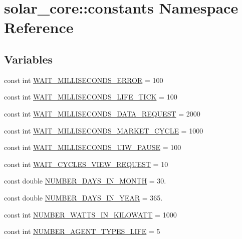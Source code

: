 \hypertarget{namespacesolar__core_1_1constants}{}\section{solar\+\_\+core\+:\+:constants Namespace Reference}
\label{namespacesolar__core_1_1constants}
\subsection*{Variables}
\begin{DoxyCompactItemize}
\item 
const int \hyperlink{namespacesolar__core_1_1constants_a4cddd8d733f9237d6fb56197354fed46}{W\+A\+I\+T\+\_\+\+M\+I\+L\+L\+I\+S\+E\+C\+O\+N\+D\+S\+\_\+\+E\+R\+R\+O\+R} = 100
\item 
const int \hyperlink{namespacesolar__core_1_1constants_ab90981a98985a16f6e239808f36186d7}{W\+A\+I\+T\+\_\+\+M\+I\+L\+L\+I\+S\+E\+C\+O\+N\+D\+S\+\_\+\+L\+I\+F\+E\+\_\+\+T\+I\+C\+K} = 100
\item 
const int \hyperlink{namespacesolar__core_1_1constants_a88d556c323e6871de3313428289b6cb6}{W\+A\+I\+T\+\_\+\+M\+I\+L\+L\+I\+S\+E\+C\+O\+N\+D\+S\+\_\+\+D\+A\+T\+A\+\_\+\+R\+E\+Q\+U\+E\+S\+T} = 2000
\item 
const int \hyperlink{namespacesolar__core_1_1constants_ab3dddf011f92328166c5f93e3951107e}{W\+A\+I\+T\+\_\+\+M\+I\+L\+L\+I\+S\+E\+C\+O\+N\+D\+S\+\_\+\+M\+A\+R\+K\+E\+T\+\_\+\+C\+Y\+C\+L\+E} = 1000
\item 
const int \hyperlink{namespacesolar__core_1_1constants_abebba44aef8bbf544a330b8b20229320}{W\+A\+I\+T\+\_\+\+M\+I\+L\+L\+I\+S\+E\+C\+O\+N\+D\+S\+\_\+\+U\+I\+W\+\_\+\+P\+A\+U\+S\+E} = 100
\item 
const int \hyperlink{namespacesolar__core_1_1constants_ae4d0a481c94f57be3e97f1c8463e631a}{W\+A\+I\+T\+\_\+\+C\+Y\+C\+L\+E\+S\+\_\+\+V\+I\+E\+W\+\_\+\+R\+E\+Q\+U\+E\+S\+T} = 10
\item 
const double \hyperlink{namespacesolar__core_1_1constants_ad1ba09888c65cd255ec5e71f9121b1ed}{N\+U\+M\+B\+E\+R\+\_\+\+D\+A\+Y\+S\+\_\+\+I\+N\+\_\+\+M\+O\+N\+T\+H} = 30.
\item 
const double \hyperlink{namespacesolar__core_1_1constants_ae81a48fc5b3417f74d5fc9b57cb023cd}{N\+U\+M\+B\+E\+R\+\_\+\+D\+A\+Y\+S\+\_\+\+I\+N\+\_\+\+Y\+E\+A\+R} = 365.
\item 
const int \hyperlink{namespacesolar__core_1_1constants_adecfde74aa5d1f05002f04c42035bfd2}{N\+U\+M\+B\+E\+R\+\_\+\+W\+A\+T\+T\+S\+\_\+\+I\+N\+\_\+\+K\+I\+L\+O\+W\+A\+T\+T} = 1000
\item 
const int \hyperlink{namespacesolar__core_1_1constants_a2ec52da705235aa418b0def4e509ef81}{N\+U\+M\+B\+E\+R\+\_\+\+A\+G\+E\+N\+T\+\_\+\+T\+Y\+P\+E\+S\+\_\+\+L\+I\+F\+E} = 5
\end{DoxyCompactItemize}


